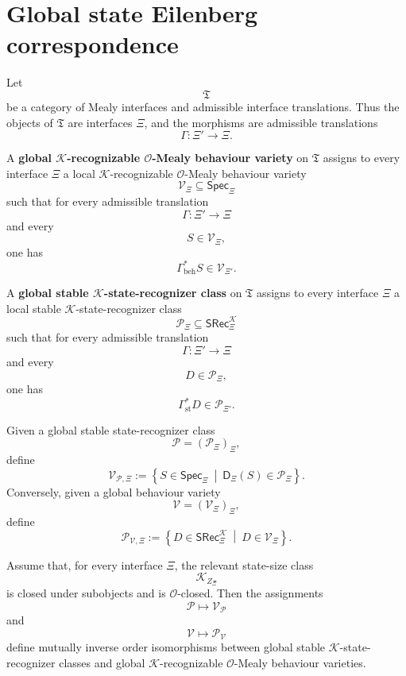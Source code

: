 \section{Global state Eilenberg correspondence}
\label{sec:eilenberg-global-state-correspondence}

Let
\[
\mathfrak T
\]
be a category of Mealy interfaces and admissible interface translations. Thus
the objects of \(\mathfrak T\) are interfaces \(\Xi\), and the morphisms are
admissible translations
\[
\Gamma:\Xi'\to\Xi.
\]

\begin{definition}
\label{def:eilenberg-global-behaviour-variety}
A \textbf{global \(\mathcal K\)-recognizable \(\mathcal O\)-Mealy behaviour
variety} on \(\mathfrak T\) assigns to every interface \(\Xi\) a local
\(\mathcal K\)-recognizable \(\mathcal O\)-Mealy behaviour variety
\[
\mathcal V_\Xi
\subseteq
\mathsf{Spec}_\Xi
\]
such that for every admissible translation
\[
\Gamma:\Xi'\to\Xi
\]
and every
\[
S\in\mathcal V_\Xi,
\]
one has
\[
\Gamma_{\mathrm{beh}}^\ast S\in\mathcal V_{\Xi'}.
\]
\end{definition}

\begin{definition}
\label{def:eilenberg-global-stable-state-recognizer-class}
A \textbf{global stable \(\mathcal K\)-state-recognizer class} on
\(\mathfrak T\) assigns to every interface \(\Xi\) a local stable
\(\mathcal K\)-state-recognizer class
\[
\mathcal P_\Xi
\subseteq
\mathsf{SRec}^{\mathcal K}_\Xi
\]
such that for every admissible translation
\[
\Gamma:\Xi'\to\Xi
\]
and every
\[
D\in\mathcal P_\Xi,
\]
one has
\[
\Gamma_{\mathrm{st}}^\ast D\in\mathcal P_{\Xi'}.
\]
\end{definition}

Given a global stable state-recognizer class
\[
\mathcal P=(\mathcal P_\Xi)_\Xi,
\]
define
\[
\mathcal V_{\mathcal P,\Xi}
:=
\left\{
S\in\mathsf{Spec}_\Xi
\ \middle|\
\mathsf D_\Xi(S)\in\mathcal P_\Xi
\right\}.
\]
Conversely, given a global behaviour variety
\[
\mathcal V=(\mathcal V_\Xi)_\Xi,
\]
define
\[
\mathcal P_{\mathcal V,\Xi}
:=
\left\{
D\in\mathsf{SRec}^{\mathcal K}_\Xi
\ \middle|\
D\in\mathcal V_\Xi
\right\}.
\]

\begin{theorem}
\label{thm:eilenberg-global-state-correspondence}
Assume that, for every interface \(\Xi\), the relevant state-size class
\[
\mathcal K_{Z_\Xi}
\]
is closed under subobjects and is \(\mathcal O\)-closed. Then the assignments
\[
\mathcal P\longmapsto\mathcal V_{\mathcal P}
\]
and
\[
\mathcal V\longmapsto\mathcal P_{\mathcal V}
\]
define mutually inverse order isomorphisms between global stable
\(\mathcal K\)-state-recognizer classes and global
\(\mathcal K\)-recognizable \(\mathcal O\)-Mealy behaviour varieties.
\end{theorem}

